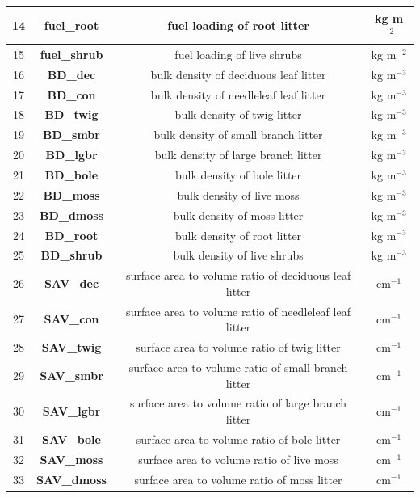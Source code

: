 \documentclass[a4paper, 12pt] {article}
\begin{document}
\begin{table} [H]
{\begin{tabular}{|c|c|c|c|}
			\hline 
			14 & \textbf{fuel\_root} & fuel loading of root litter & kg m$^{-2}$   \\
			\hline 
			15 & \textbf{fuel\_shrub} & fuel loading of live shrubs &  kg m$^{-2}$  \\
			\hline 
			16 & \textbf{BD\_dec} & bulk density of deciduous leaf litter &  kg m$^{-3}$   \\
			\hline 
			17 & \textbf{BD\_con} &  bulk density of needleleaf leaf litter  & kg m$^{-3}$  \\
			\hline 
			18 & \textbf{BD\_twig} & bulk density of twig litter   & kg m$^{-3}$   \\
			\hline 
			19 & \textbf{BD\_smbr} & bulk density of small branch litter  & kg m$^{-3}$   \\
			\hline 
			20 & \textbf{BD\_lgbr} & bulk density of large branch litter  & kg m$^{-3}$   \\
			\hline 
			21 & \textbf{BD\_bole} & bulk density of bole litter & kg m$^{-3}$   \\
			\hline 
			22 & \textbf{BD\_moss} & bulk density of live moss & kg m$^{-3}$   \\
			\hline 
			23 & \textbf{BD\_dmoss} & bulk density of moss litter & kg m$^{-3}$   \\
			\hline 
			24 & \textbf{BD\_root} & bulk density of root litter & kg m$^{-3}$  \\
			\hline 
			25 & \textbf{BD\_shrub} & bulk density of live shrubs & kg m$^{-3}$  \\
			\hline 
			26 & \textbf{SAV\_dec} & surface area to volume ratio of deciduous leaf litter &  cm$^{-1}$   \\
			\hline 
			27 & \textbf{SAV\_con} &  surface area to volume ratio of needleleaf leaf litter  & cm$^{-1}$  \\
			\hline 
			28 & \textbf{SAV\_twig} & surface area to volume ratio of twig litter   & cm$^{-1}$   \\
			\hline 
			29 & \textbf{SAV\_smbr} & surface area to volume ratio of small branch litter  &cm$^{-1}$   \\
			\hline 
			30 & \textbf{SAV\_lgbr} & surface area to volume ratio of large branch litter  & cm$^{-1}$   \\
			\hline 
			31 & \textbf{SAV\_bole} & surface area to volume ratio of bole litter & cm$^{-1}$  \\
			\hline 
			32 & \textbf{SAV\_moss} & surface area to volume ratio of live moss & cm$^{-1}$   \\
			\hline 
			33 & \textbf{SAV\_dmoss} & surface area to volume ratio of moss litter & cm$^{-1}$   \\

\end{tabular}}
\end{table}
\end{document}
